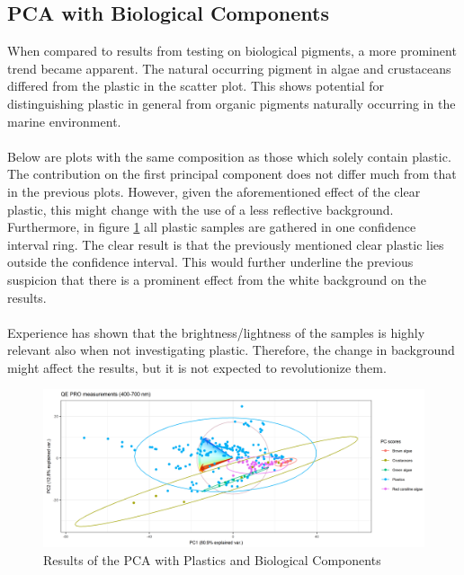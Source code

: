 \subsection{PCA with Biological Components}
When compared to results from testing on biological pigments, a more prominent trend became apparent. The natural occurring pigment in algae and crustaceans differed from the plastic in the scatter plot. This shows potential for distinguishing plastic in general from organic pigments naturally occurring in the marine environment.
\\\\%
Below are plots with the same composition as those which solely contain plastic. The contribution on the first principal component does not differ much from that in the previous plots. However, given the aforementioned effect of the clear plastic, this might change with the use of a less reflective background. Furthermore, in figure \ref{fig:PCA_plastics_and_biology_scat} all plastic samples are gathered in one confidence interval ring. The clear result is that the previously mentioned clear plastic lies outside the confidence interval. This would further underline the previous suspicion that there is a prominent effect from the white background on the results.
\\\\
Experience has shown that the brightness/lightness of the samples is highly relevant also when not investigating plastic. Therefore, the change in background might affect the results, but it is not expected to revolutionize them.

\begin{figure}[H]
    \centering
    \includegraphics[width=1\textwidth]{Images/results/PCA_plastics_and_biology_scat_clust.png}
    \caption{Results of the PCA with Plastics and Biological Components}
    \label{fig:PCA_plastics_and_biology_scat}
\end{figure}

